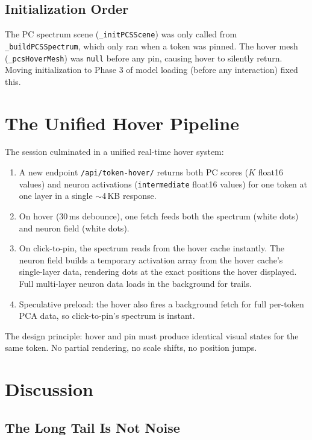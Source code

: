 \documentclass[11pt,a4paper]{article}
\begin{document}
\subsection{Initialization Order}

The PC spectrum scene (\texttt{\_initPCSScene}) was only called from \texttt{\_buildPCSSpectrum}, which only ran when a token was pinned. The hover mesh (\texttt{\_pcsHoverMesh}) was \texttt{null} before any pin, causing hover to silently return. Moving initialization to Phase 3 of model loading (before any interaction) fixed this.

\section{The Unified Hover Pipeline}

The session culminated in a unified real-time hover system:

\begin{enumerate}[nosep]
  \item A new endpoint \texttt{/api/token-hover/} returns both PC scores ($K$ float16 values) and neuron activations (\texttt{intermediate} float16 values) for one token at one layer in a single $\sim$4\,KB response.
  \item On hover (30\,ms debounce), one fetch feeds both the spectrum (white dots) and neuron field (white dots).
  \item On click-to-pin, the spectrum reads from the hover cache instantly. The neuron field builds a temporary activation array from the hover cache's single-layer data, rendering dots at the exact positions the hover displayed. Full multi-layer neuron data loads in the background for trails.
  \item Speculative preload: the hover also fires a background fetch for full per-token PCA data, so click-to-pin's spectrum is instant.
\end{enumerate}

The design principle: hover and pin must produce identical visual states for the same token. No partial rendering, no scale shifts, no position jumps.

\section{Discussion}

\subsection{The Long Tail Is Not Noise}
\end{document}
